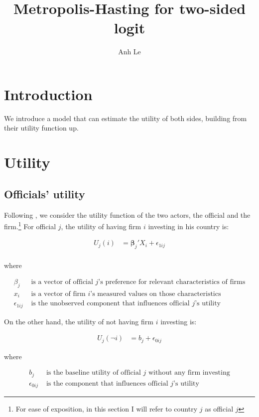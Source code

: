\documentclass[12pt]{article}
\title{Metropolis-Hasting for two-sided logit}
\author{Anh Le}
\begin{document}
\maketitle


\section{Introduction}

We introduce a model that can estimate the utility of both sides, building from their utility function up.

\section{Utility}

\subsection{Officials' utility}

Following \citet{Logan1998}, we consider the utility function of the two actors, the official and the firm.\footnote{For ease of exposition, in this section I will refer to country $j$ as official $j$} For official $j$, the utility of having firm $i$ investing in his country is:

\begin{align}
U_j(i) &= \bm{\beta}_j' X_i + \epsilon_{1ij} \\
\end{align}

where

\begin{align*}
\beta_j &\text{ is a vector of official $j$'s preference for relevant characteristics of firms} \\
x_i &\text{ is a vector of firm $i$'s measured values on those characteristics} \\
\epsilon_{1ij} &\text{ is the unobserved component that influences official $j$'s utility}
\end{align*}

On the other hand, the utility of not having firm $i$ investing is:

\begin{align}
U_j(\neg i) &= b_j + \epsilon_{0ij}
\end{align}

where

\begin{align*}
b_j &\text{ is the baseline utility of official $j$ without any firm investing} \\
\epsilon_{0ij} &\text{ is the component that influences official $j$'s utility}
\end{align*}
\end{document}
